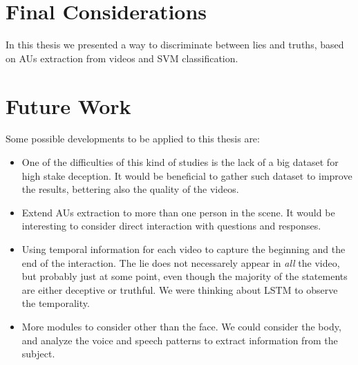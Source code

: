 

\section{Final Considerations}
In this thesis we presented a way to discriminate between lies and truths, based on AUs extraction from videos and SVM classification.





\section{Future Work}
Some possible developments to be applied to this thesis are:
\begin{itemize}
	\item One of the difficulties of this kind of studies is the lack of a big dataset for high stake deception. It would be beneficial to gather such dataset to improve the results, bettering also the quality of the videos.
	\item Extend AUs extraction to more than one person in the scene. It would be interesting to consider direct interaction with questions and responses. 
	\item Using temporal information for each video to capture the beginning and the end of the interaction. The lie does not necessarely appear in \textit{all} the video, but probably just at some point, even though the majority of the statements are either deceptive or truthful. We were thinking about LSTM to observe the temporality.
	\item More modules to consider other than the face. We could consider the body, and analyze the voice and speech patterns to extract information from the subject.
\end{itemize}
